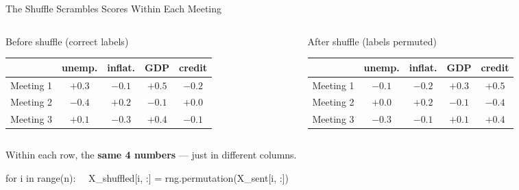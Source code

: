 \documentclass[10pt,aspectratio=169]{beamer}
\begin{document}
\begin{frame}{The Shuffle Scrambles Scores Within Each Meeting}
  \vspace{-2pt}
  \begin{columns}[T]
    \begin{column}{0.48\textwidth}
      \begin{block}{Before shuffle (correct labels)}
        \centering\footnotesize
        \begin{tabular}{lcccc}
          & \textbf{unemp.} & \textbf{inflat.} & \textbf{GDP} & \textbf{credit} \\
          \midrule
          Meeting 1 & $+0.3$ & $-0.1$ & $+0.5$ & $-0.2$ \\
          Meeting 2 & $-0.4$ & $+0.2$ & $-0.1$ & $+0.0$ \\
          Meeting 3 & $+0.1$ & $-0.3$ & $+0.4$ & $-0.1$ \\
        \end{tabular}
      \end{block}
    \end{column}
    \begin{column}{0.48\textwidth}
      \begin{block}{After shuffle (labels permuted)}
        \centering\footnotesize
        \begin{tabular}{lcccc}
          & \textbf{unemp.} & \textbf{inflat.} & \textbf{GDP} & \textbf{credit} \\
          \midrule
          Meeting 1 & $-0.1$ & $-0.2$ & $+0.3$ & $+0.5$ \\
          Meeting 2 & $+0.0$ & $+0.2$ & $-0.1$ & $-0.4$ \\
          Meeting 3 & $-0.3$ & $-0.1$ & $+0.1$ & $+0.4$ \\
        \end{tabular}
      \end{block}
    \end{column}
  \end{columns}
  \vspace{4pt}
  \begin{center}
    \small Within each row, the \textbf{same 4 numbers} --- just in different columns.\\[2pt]
  \end{center}
  \begin{block}{}
    \centering\footnotesize\ttfamily
    for i in range(n): ~~X\_shuffled[i, :] = rng.permutation(X\_sent[i, :])
  \end{block}
\end{frame}
\end{document}
